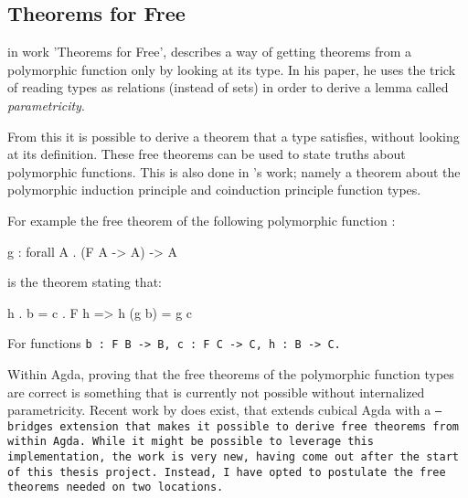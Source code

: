 
\subsection{Theorems for Free}\label{sec:free}
\cite{Wadler1989} in work 'Theorems for Free', describes a way of getting theorems from a polymorphic function only by looking at its type.
In his paper, he uses the trick of reading types as relations (instead of sets) in order to derive a lemma called \textit{parametricity}.

From this it is possible to derive a theorem that a type satisfies, without looking at its definition.
These free theorems can be used to state truths about polymorphic functions.
This is also done in \cite{Harper2011}'s work; namely a theorem about the polymorphic induction principle and coinduction principle function types.

For example the free theorem of the following polymorphic function \citep{Harper2011}:
\begin{code}
g : forall A . (F A -> A) -> A
\end{code}
is the theorem stating that:
\begin{code}
h . b = c . F h => h (g b) = g c
\end{code}
For functions \tt{b : F B -> B}, \tt{c : F C -> C}, \tt{h : B -> C}.


Within Agda, proving that the free theorems of the polymorphic function types are correct is something that is currently not possible without internalized parametricity.
Recent work by \cite{Muylder2024} does exist, that extends cubical Agda with a \tt{--bridges} extension that makes it possible to derive free theorems from within Agda.
While it might be possible to leverage this implementation, the work is very new, having come out after the start of this thesis project.
Instead, I have opted to postulate the free theorems needed on two locations.
